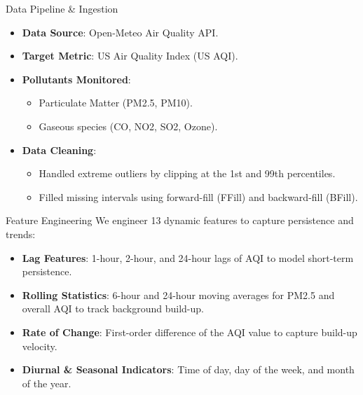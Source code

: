 \documentclass[aspectratio=169]{beamer}
\begin{document}
\begin{frame}{Data Pipeline \& Ingestion}
  \begin{itemize}
    \item \textbf{Data Source}: Open-Meteo Air Quality API.
    \item \textbf{Target Metric}: US Air Quality Index (US AQI).
    \item \textbf{Pollutants Monitored}:
      \begin{itemize}
        \item Particulate Matter (PM2.5, PM10).
        \item Gaseous species (CO, NO2, SO2, Ozone).
      \end{itemize}
    \item \textbf{Data Cleaning}:
      \begin{itemize}
        \item Handled extreme outliers by clipping at the 1st and 99th percentiles.
        \item Filled missing intervals using forward-fill (FFill) and backward-fill (BFill).
      \end{itemize}
  \end{itemize}
\end{frame}

\begin{frame}{Feature Engineering}
  We engineer 13 dynamic features to capture persistence and trends:
  \begin{itemize}
    \item \textbf{Lag Features}: 1-hour, 2-hour, and 24-hour lags of AQI to model short-term persistence.
    \item \textbf{Rolling Statistics}: 6-hour and 24-hour moving averages for PM2.5 and overall AQI to track background build-up.
    \item \textbf{Rate of Change}: First-order difference of the AQI value to capture build-up velocity.
    \item \textbf{Diurnal \& Seasonal Indicators}: Time of day, day of the week, and month of the year.
  \end{itemize}
\end{frame}
\end{document}
